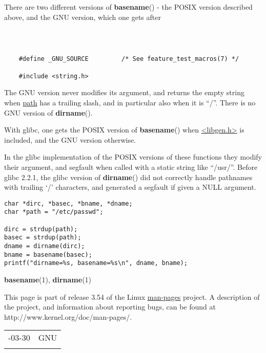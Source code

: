 \documentclass[]{article}
\let\realtextbf=\textbf
\renewcommand{\textbf}[1]{\textcolor{boldcolor}{\realtextbf{#1}}}
\renewcommand{\emph}[1]{\underline{#1}}
\begin{document}
There are two different versions of \textbf{basename}() - the POSIX
version described above, and the GNU version, which one gets after

~

\begin{verbatim}

    #define _GNU_SOURCE         /* See feature_test_macros(7) */
 
    #include <string.h>
\end{verbatim}

The GNU version never modifies its argument, and returns the empty
string when \emph{path} has a trailing slash, and in particular also
when it is ``/''. There is no GNU version of \textbf{dirname}().

With glibc, one gets the POSIX version of \textbf{basename}() when
\emph{\textless{}libgen.h\textgreater{}} is included, and the GNU
version otherwise.


In the glibc implementation of the POSIX versions of these functions
they modify their argument, and segfault when called with a static
string like ``/usr/''. Before glibc 2.2.1, the glibc version of
\textbf{dirname}() did not correctly handle pathnames with trailing `/'
characters, and generated a segfault if given a NULL argument.


\begin{verbatim}
char *dirc, *basec, *bname, *dname;
char *path = "/etc/passwd";

dirc = strdup(path);
basec = strdup(path);
dname = dirname(dirc);
bname = basename(basec);
printf("dirname=%s, basename=%s\n", dname, bname);
\end{verbatim}


\textbf{basename}(1), \textbf{dirname}(1)


This page is part of release 3.54 of the Linux \emph{man-pages} project.
A description of the project, and information about reporting bugs, can
be found at http://www.kernel.org/doc/man-pages/.

\begin{longtable}[c]{@{}ll@{}}
\toprule\addlinespace
2009-03-30 & GNU
\\\addlinespace
\bottomrule
\end{longtable}
\end{document}
